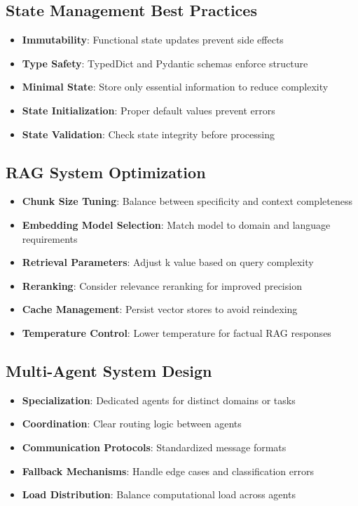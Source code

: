\documentclass[12pt,a4paper]{article}
\begin{document}
\subsection{State Management Best Practices}

\begin{itemize}
    \item \textbf{Immutability}: Functional state updates prevent side effects
    \item \textbf{Type Safety}: TypedDict and Pydantic schemas enforce structure
    \item \textbf{Minimal State}: Store only essential information to reduce complexity
    \item \textbf{State Initialization}: Proper default values prevent errors
    \item \textbf{State Validation}: Check state integrity before processing
\end{itemize}

\subsection{RAG System Optimization}

\begin{itemize}
    \item \textbf{Chunk Size Tuning}: Balance between specificity and context completeness
    \item \textbf{Embedding Model Selection}: Match model to domain and language requirements
    \item \textbf{Retrieval Parameters}: Adjust k value based on query complexity
    \item \textbf{Reranking}: Consider relevance reranking for improved precision
    \item \textbf{Cache Management}: Persist vector stores to avoid reindexing
    \item \textbf{Temperature Control}: Lower temperature for factual RAG responses
\end{itemize}

\subsection{Multi-Agent System Design}

\begin{itemize}
    \item \textbf{Specialization}: Dedicated agents for distinct domains or tasks
    \item \textbf{Coordination}: Clear routing logic between agents
    \item \textbf{Communication Protocols}: Standardized message formats
    \item \textbf{Fallback Mechanisms}: Handle edge cases and classification errors
    \item \textbf{Load Distribution}: Balance computational load across agents
\end{itemize}
\end{document}
